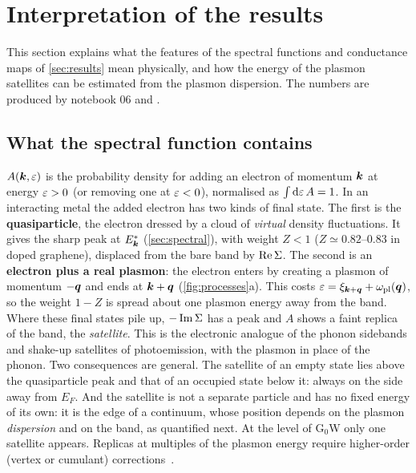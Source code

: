 \section{Interpretation of the results}
\label{sec:interpretation}

This section explains what the features of the spectral functions and conductance maps of
\cref{sec:results} mean physically, and how the energy of the plasmon satellites can be estimated from
the plasmon dispersion. The numbers are produced by notebook 06 and .

\subsection{What the spectral function contains}

$A(\bm k,\varepsilon)$ is the probability density for adding an electron of momentum $\bm k$ at energy $\varepsilon>0$ (or
removing one at $\varepsilon<0$), normalised as $\int\mathrm d\varepsilon\,A=1$. In an interacting metal the added electron has two kinds of
final state. The first is the \textbf{quasiparticle}, the electron dressed by a cloud of \emph{virtual} density
fluctuations. It gives the sharp peak at $E^*_{\bm k}$ (\cref{sec:spectral}), with weight $Z<1$ ($Z\simeq0.82$--$0.83$ in
doped graphene), displaced from the bare band by $\operatorname{Re}\Sigma$. The second is an \textbf{electron plus a real plasmon}:
the electron enters by creating a plasmon of momentum $-\bm q$ and ends at $\bm k+\bm q$ (\cref{fig:processes}a). This costs
$\varepsilon=\xi_{\bm k+\bm q}+\omega_{\rm pl}(\bm q)$, so the weight $1-Z$ is spread about one plasmon energy away from the band. Where
these final states pile up, $-\operatorname{Im}\Sigma$ has a peak and $A$ shows a faint replica of the band, the \emph{satellite}.
This is the electronic analogue of the phonon sidebands and shake-up satellites of photoemission, with the
plasmon in place of the phonon. Two consequences are general. The satellite of an empty state lies above the
quasiparticle peak and that of an occupied state below it: always on the side away from $E_F$. And the
satellite is not a separate particle and has no fixed energy of its own: it is the edge of a continuum, whose
position depends on the plasmon \emph{dispersion} and on the band, as quantified next. At the level of G$_0$W
only one satellite appears. Replicas at multiples of the plasmon energy require higher-order (vertex or
cumulant) corrections~\cite{Aryasetiawan1996}.


